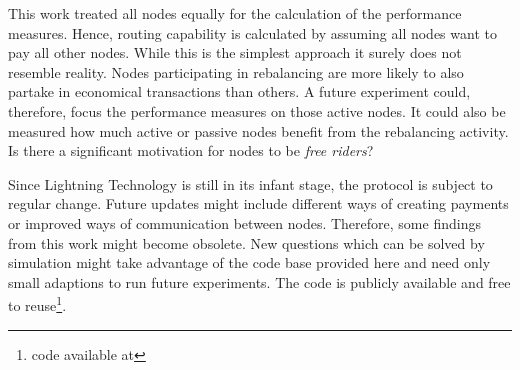 \documentclass[final]{fhnwreport}       %
\begin{document}
This work treated all nodes equally for the calculation of the performance measures. Hence, routing capability is calculated by assuming all nodes want to pay all other nodes. While this is the simplest approach it surely does not resemble reality. Nodes participating in rebalancing are more likely to also partake in economical transactions than others. A future experiment could, therefore, focus the performance measures on those active nodes. It could also be measured how much active or passive nodes benefit from the rebalancing activity. Is there a significant motivation for nodes to be \emph{free riders}?

Since Lightning Technology is still in its infant stage, the protocol is subject to regular change. Future updates might include different ways of creating payments or improved ways of communication between nodes. Therefore, some findings from this work might become obsolete. New questions which can be solved by simulation might take advantage of the code base provided here and need only small adaptions to run future experiments. The code is publicly available and free to reuse\footnote{code available at \githubsim}.

\newpage
{\sloppypar
\printbibliography[heading=bibintoc]
\label{sec:lit}
}

\newpage
\listoffigures

\listoftables

\newpage








\end{document}
